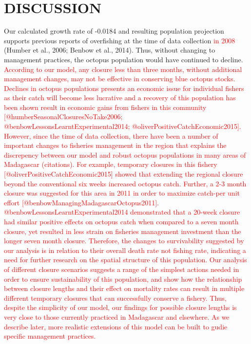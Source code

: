 \documentclass[
]{article}
\begin{document}
\hypertarget{discussion}{%
\section{DISCUSSION}\label{discussion}}

Our calculated growth rate of -0.0184 and resulting population projection supports previous reports of overfishing at the time of data collection \textcolor{red}{in 2008} (Humber et al., 2006; Benbow et al., 2014). Thus, without changing to management practices, the octopus population would have continued to decline. \textcolor{red}{According to our model, any closure less than three months, without additional management changes, may not be effective in conserving blue octopus stocks. Declines in octopus populations presents an economic issue for individual fishers as their catch will become less lucrative and a recovery of this population has been shown result in economic gains from fishers in this community [@humberSeasonalClosuresNoTake2006; @benbowLessonsLearntExperimental2014; @oliverPositiveCatchEconomic2015]. However, since the time of data collection, there have been a number of important changes to fisheries management in the region that explains the discrepency between our model and robust octopus populations in many areas of Madagascar (citations).} \textcolor{red}{For example, temporary closures in this fishery [@oliverPositiveCatchEconomic2015] showed that extending the regional closure beyond the conventional six weeks increased octopus catch. Further, a 2-3 month closure was suggested for this area in 2011 in order to maximize catch-per unit effort [@benbowManagingMadagascarOctopus2011]. @benbowLessonsLearntExperimental2014 demonstrated that a 20-week closure had similar positive effects on octopus catch when compared to a seven month closure, yet resulted in less strain on fisheries management investment than the longer seven month closure. Therefore, the changes to survivability suggested by our analysis is in relation to their overall death rate not fishing rate, indicating a need for further research on the spatial structure of this population. Our analysis of different closure scenarios suggests a range of the simplest actions needed in order to ensure sustainability of this population, and show how the relationship between closure lengths and their effect on mortality rates can result in multiple different temporary closures that can successfully conserve a fishery. Thus, despite the simplicity of our model, our findings for possible closure lengths is very close to those currently practiced in Madagascar and elsewhere. As we describe later, more realistic extensions of this model can be built to gudie specific management practices.}
\end{document}
